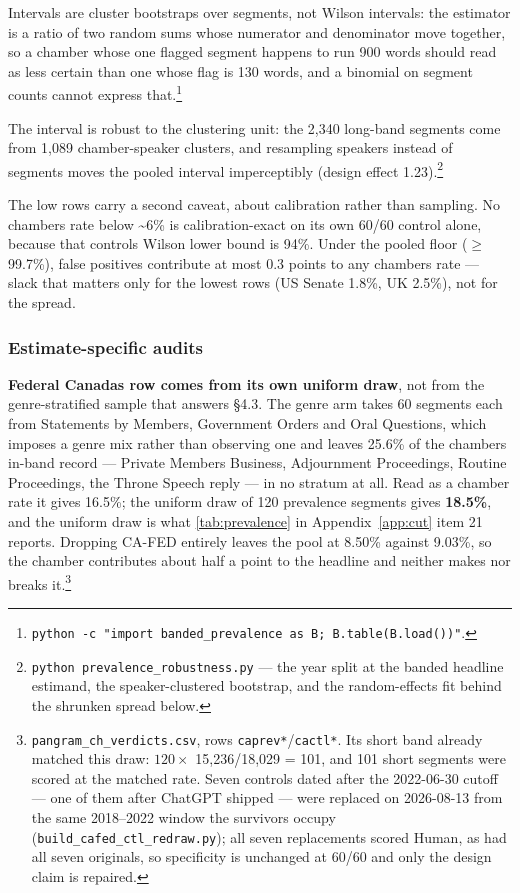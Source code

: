 Intervals are cluster bootstraps over segments, not Wilson intervals: the
estimator is a ratio of two random sums whose numerator and denominator move
together, so a chamber whose one flagged segment happens to run 900 words
should read as less certain than one whose flag is 130 words, and a binomial on
segment counts cannot express that.\footnote{\texttt{python\ -\allowbreak{}c\ "import\ banded\_\allowbreak{}prevalence\ as\ B;\ B.\allowbreak{}table(B.\allowbreak{}load())"}.}

The interval is robust to the clustering unit: the 2,340 long-band segments
come from 1,089 chamber-speaker clusters, and resampling speakers instead of
segments moves the pooled interval imperceptibly (design effect 1.23).\footnote{\texttt{python\ prevalence\_\allowbreak{}robustness.\allowbreak{}py} --- the year split at the
  banded headline estimand, the speaker-clustered bootstrap, and the
  random-effects fit behind the shrunken spread below.}

The low rows carry a second caveat, about calibration rather than sampling. No
chamber\textquotesingle s rate below \textasciitilde6\% is calibration-exact on its own 60/60 control alone,
because that control\textquotesingle s Wilson lower bound is 94\%. Under the pooled floor
(\(\geq\)99.7\%), false positives contribute at most 0.3 points to any chamber\textquotesingle s
rate --- slack that matters only for the lowest rows (US Senate 1.8\%, UK 2.5\%),
not for the spread.

\subsubsection{Estimate-specific audits}\label{sec:prevalence-audits}

\textbf{Federal Canada\textquotesingle s row comes from its own uniform draw}, not from the
genre-stratified sample that answers §4.3. The genre arm takes 60 segments
each from Statements by Members, Government Orders and Oral Questions, which
imposes a genre mix rather than observing one and leaves 25.6\% of the chamber\textquotesingle s
in-band record --- Private Members\textquotesingle{} Business, Adjournment Proceedings, Routine
Proceedings, the Throne Speech reply --- in no stratum at all. Read as a chamber
rate it gives 16.5\%; the uniform draw of 120 prevalence segments gives \textbf{18.5\%},
and the uniform draw is what \cref{tab:prevalence} in Appendix~\ref{app:cut} item 21 reports. Dropping CA-FED entirely leaves
the pool at 8.50\% against 9.03\%, so the chamber contributes about half a point
to the headline and neither makes nor breaks it.\footnote{\texttt{pangram\_\allowbreak{}ch\_\allowbreak{}verdicts.\allowbreak{}csv}, rows \texttt{caprev*}/\texttt{cactl*}. Its short band
  already matched this draw: \(120\times\) 15,236/18,029 = 101, and 101 short
  segments were scored at the matched rate. Seven controls dated after the
  2022-06-30 cutoff --- one of them after ChatGPT shipped --- were replaced on
  2026-08-13 from the same 2018--2022 window the survivors occupy
  (\texttt{build\_\allowbreak{}cafed\_\allowbreak{}ctl\_\allowbreak{}redraw.\allowbreak{}py}); all seven replacements scored Human, as had
  all seven originals, so specificity is unchanged at 60/60 and only the
  design claim is repaired.}

